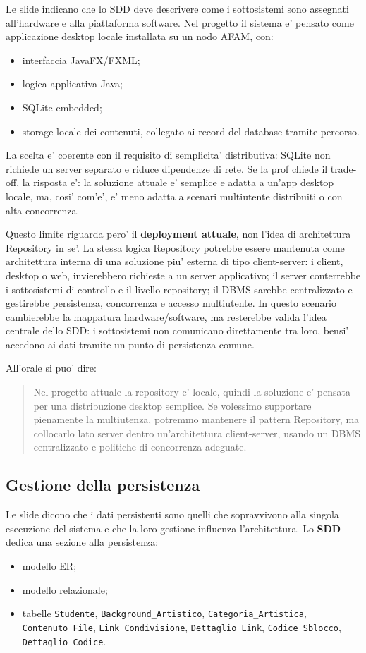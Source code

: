 ﻿\documentclass[11pt,a4paper]{article}
\newcommand{\doc}[1]{\textbf{#1}}
\newcommand{\term}[1]{\textbf{#1}}
\begin{document}
Le slide indicano che lo SDD deve descrivere come i sottosistemi sono assegnati
all'hardware e alla piattaforma software. Nel progetto il sistema e' pensato come
applicazione desktop locale installata su un nodo AFAM, con:
\begin{itemize}
  \item interfaccia JavaFX/FXML;
  \item logica applicativa Java;
  \item SQLite embedded;
  \item storage locale dei contenuti, collegato ai record del database tramite percorso.
\end{itemize}

La scelta e' coerente con il requisito di semplicita' distributiva: SQLite non richiede un
server separato e riduce dipendenze di rete. Se la prof chiede il trade-off, la risposta e':
la soluzione attuale e' semplice e adatta a un'app desktop locale, ma, cosi' com'e',
e' meno adatta a scenari multiutente distribuiti o con alta concorrenza.

Questo limite riguarda pero' il \term{deployment attuale}, non l'idea di architettura
Repository in se'. La stessa logica Repository potrebbe essere mantenuta come architettura
interna di una soluzione piu' esterna di tipo client-server: i client, desktop o web,
invierebbero richieste a un server applicativo; il server conterrebbe i sottosistemi di
controllo e il livello repository; il DBMS sarebbe centralizzato e gestirebbe persistenza,
concorrenza e accesso multiutente. In questo scenario cambierebbe la mappatura
hardware/software, ma resterebbe valida l'idea centrale dello SDD: i sottosistemi non
comunicano direttamente tra loro, bensi' accedono ai dati tramite un punto di persistenza
comune.

All'orale si puo' dire:
\begin{quote}
Nel progetto attuale la repository e' locale, quindi la soluzione e' pensata per una
distribuzione desktop semplice. Se volessimo supportare pienamente la multiutenza,
potremmo mantenere il pattern Repository, ma collocarlo lato server dentro
un'architettura client-server, usando un DBMS centralizzato e politiche di concorrenza
adeguate.
\end{quote}

\subsection{Gestione della persistenza}

Le slide dicono che i dati persistenti sono quelli che sopravvivono alla singola esecuzione
del sistema e che la loro gestione influenza l'architettura. Lo \doc{SDD} dedica una sezione
alla persistenza:
\begin{itemize}
  \item modello ER;
  \item modello relazionale;
  \item tabelle \texttt{Studente}, \texttt{Background\_Artistico},
  \texttt{Categoria\_Artistica}, \texttt{Contenuto\_File},
  \texttt{Link\_Condivisione}, \texttt{Dettaglio\_Link},
  \texttt{Codice\_Sblocco}, \texttt{Dettaglio\_Codice}.
\end{itemize}
\end{document}
